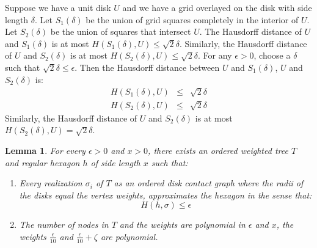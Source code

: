 \documentclass[10pt]{CSUNthesis}
\theoremstyle{plain}%
\newtheorem{lem}{Lemma}
\theoremstyle{definition}
\theoremstyle{remark}
\newcommand{\lr}[1]{\left( #1 \right)}
\begin{document}
Suppose we have a unit disk $U$ and we have a grid overlayed on the disk with side length $\delta$.  
Let $S_1(\delta)$ be the union of grid squares completely in the interior of $U$.  
Let $S_2(\delta)$ be the union of squares that intersect $U$.  
The Hausdorff distance of $U$ and $S_1(\delta)$ is at most $H\lr{S_1(\delta), U}\leq\sqrt{2}\delta$.  
Similarly, the Hausdorff distance of $U$ and $S_2(\delta)$ is at most $H\lr{S_2(\delta), U}\leq\sqrt{2}\delta$.
For any $\epsilon>0$, choose a $\delta$ such that $\sqrt{2}\delta \leq \epsilon$. Then the Hausdorff distance between $U$ and $S_1(\delta)$, $U$ and $S_2(\delta)$ is: 
$$
\begin{array}{rcl}
H\lr{S_1(\delta), U}&\leq&\sqrt{2}\delta\\
H\lr{S_2(\delta), U}&\leq&\sqrt{2}\delta
\end{array}
$$  
Similarly, the Hausdorff distance of $U$ and $S_2(\delta)$ is at most $H\lr{S_2(\delta), U}=\sqrt{2}\delta$.

\begin{lem}\label{lem:ch4IntroLemma}
For every $\epsilon > 0$ and $x>0$, there exists an ordered weighted tree $T$ and regular hexagon $h$ of side length $x$ such that:
\begin{enumerate}
\item Every realization $\sigma_i$ of $T$ as an ordered disk contact graph where the radii of the disks equal the vertex weights, approximates the hexagon in the sense that:
$$H\lr{h,\sigma}\leq\epsilon$$
\item The number of nodes in $T$ and the weights are polynomial in $\epsilon$ and $x$, the weights $\frac{\epsilon}{10}$ and $\frac{\epsilon}{10} + \zeta$ are polynomial.
\end{enumerate}
\end{lem} 
\end{document}
